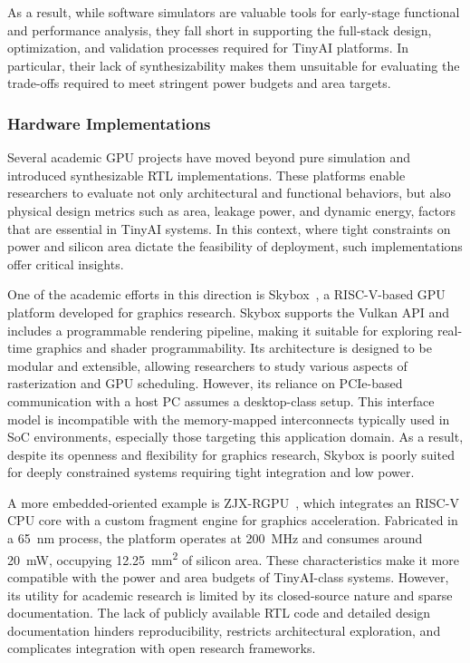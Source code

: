                 As a result, while software simulators are valuable tools for early-stage functional and performance analysis, they fall short in supporting the full-stack design, optimization, and validation processes required for TinyAI platforms. In particular, their lack of synthesizability makes them unsuitable for evaluating the trade-offs required to meet stringent power budgets and area targets.

            \subsubsection*{Hardware Implementations} 
            
                Several academic GPU projects have moved beyond pure simulation and introduced synthesizable RTL implementations. These platforms enable researchers to evaluate not only architectural and functional behaviors, but also physical design metrics such as area, leakage power, and dynamic energy, factors that are essential in TinyAI systems. In this context, where tight constraints on power and silicon area dictate the feasibility of deployment, such implementations offer critical insights.
                
                One of the academic efforts in this direction is Skybox~\cite{skybox}, a RISC-V-based GPU platform developed for graphics research. Skybox supports the Vulkan API and includes a programmable rendering pipeline, making it suitable for exploring real-time graphics and shader programmability. Its architecture is designed to be modular and extensible, allowing researchers to study various aspects of rasterization and GPU scheduling. However, its reliance on PCIe-based communication with a host PC assumes a desktop-class setup. This interface model is incompatible with the memory-mapped interconnects typically used in SoC environments, especially those targeting this application domain. As a result, despite its openness and flexibility for graphics research, Skybox is poorly suited for deeply constrained systems requiring tight integration and low power.
                
                A more embedded-oriented example is ZJX-RGPU~\cite{zjx-rgpu}, which integrates an RISC-V CPU core with a custom fragment engine for graphics acceleration. Fabricated in a \SI{65}{\nano\meter} process, the platform operates at \SI{200}{\mega\hertz} and consumes around \SI{20}{\milli\watt}, occupying \SI{12.25}{\milli\meter\squared} of silicon area. These characteristics make it more compatible with the power and area budgets of TinyAI-class systems. However, its utility for academic research is limited by its closed-source nature and sparse documentation. The lack of publicly available RTL code and detailed design documentation hinders reproducibility, restricts architectural exploration, and complicates integration with open research frameworks.
                
